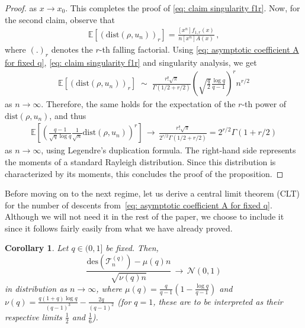 \documentclass{article}
\newtheorem{corollary}[theorem]{Corollary}
\theoremstyle{remark}
\newcommand{\cv}[1]{\,\underset{#1}{\longrightarrow}\,}
\newcommand{\dist}{\mathrm{dist}}
\newcommand{\cT}{\mathcal{T}}
\newcommand{\expec}[1]{\mathbb{E}{\left[#1\right]}}
\newcommand{\Normal}[2]{\mathcal{N}{\left(#1,#2\right)}}
\newcommand{\des}[1]{{\mathrm{des}{\left(#1\right)}}}
\begin{document}
\begin{proof}
    as $x\to x_0$.
    This completes the proof of \eqref{eq: claim singularity f1r}.
    Now, for the second claim, observe that
    \begin{align*}
        \expec{ \left( \dist(\rho,u_n) \right)_r } = \frac{[x^n] f_{1,r}(x)}{n [x^n] A(x)} \,,
    \end{align*}
    where $(.)_r$ denotes the $r$-th falling factorial.
    Using \eqref{eq: asymptotic coefficient A for fixed q}, \eqref{eq: claim singularity f1r} and singularity analysis, we get
    \begin{align*}
        \expec{ \left( \dist(\rho,u_n) \right)_r } 
        \;\sim\; \frac{r! \sqrt\pi}{\Gamma(1/2+r/2)} \left( \sqrt{\frac{q}{2}} \frac{\log q}{q-1} \right)^r n^{r/2}
    \end{align*}
    as $n\to\infty$.
    Therefore, the same holds for the expectation of the $r$-th power of $\dist(\rho,u_n)$, and thus
    \begin{align*}
        \expec{ \left( \frac{q-1}{\sqrt q \log q} \frac{1}{\sqrt n} \dist(\rho,u_n) \right)^r } 
        \cv{} \frac{r! \sqrt\pi}{2^{r/2}\Gamma(1/2+r/2)} 
        = 2^{r/2} \Gamma(1+r/2)
    \end{align*}
    as $n\to\infty$, using Legendre's duplication formula.
    The right-hand side represents the moments of a standard Rayleigh distribution.
    Since this distribution is characterized by its moments, this concludes the proof of the proposition.
\end{proof}
    
Before moving on to the next regime, let us derive a central limit theorem (CLT) for the number of descents from~\eqref{eq: asymptotic coefficient A for fixed q}.
Although we will not need it in the rest of the paper, we choose to include it since it follows fairly easily from what we have already proved.

\begin{corollary}\label{cor: CLT descents q fixed}
    Let $q\in(0,1]$ be fixed.
    Then,
    \begin{equation*}
        \frac{\des{\cT_n^{(q)}} - \mu(q) n}{\sqrt{\nu(q) n}}
        \cv{}
        \Normal{0}{1}
    \end{equation*}
    in distribution as $n\to\infty$, where $\mu(q) = \frac{q}{q-1}\left( 1 - \frac{\log q}{q-1} \right)$ and $\nu(q) = \frac{q(1+q)\log q}{(q-1)^3} -\frac{2q}{(q-1)^2}$ (for $q=1$, these are to be interpreted as their respective limits $\frac12$ and $\frac16$).
\end{corollary}
\end{document}
